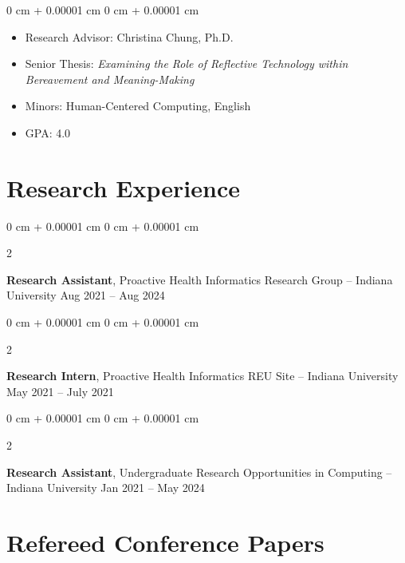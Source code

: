 \documentclass[10pt, letterpaper]{article}
\newenvironment{highlights}{
    \begin{itemize}[
        topsep=0.10 cm,
        parsep=0.10 cm,
        partopsep=0pt,
        itemsep=0pt,
        leftmargin=0 cm + 10pt
    ]
}{
    \end{itemize}
} %
\newenvironment{onecolentry}{
    \begin{adjustwidth}{
        0 cm + 0.00001 cm
    }{
        0 cm + 0.00001 cm
    }
}{
    \end{adjustwidth}
} %
\newenvironment{twocolentry}[2][]{
    \onecolentry
    \def\secondColumn{#2}
    \setcolumnwidth{\fill, 4.5 cm}
    \begin{paracol}{2}
}{
    \switchcolumn \raggedleft \secondColumn
    \end{paracol}
    \endonecolentry
} %
\begin{document}
        \vspace{0.10 cm}
        \begin{onecolentry}
            \begin{highlights}
                \item Research Advisor: Christina Chung, Ph.D.
                \item Senior Thesis: \textit{Examining the Role of Reflective Technology within Bereavement and Meaning-Making}
                \item Minors: Human-Centered Computing, English
                \item GPA: 4.0
            \end{highlights}
        \end{onecolentry}



    
    \section{Research Experience}



        
        \begin{twocolentry}{
            Aug 2021 – Aug 2024
        }
            \textbf{Research Assistant}, Proactive Health Informatics Research Group -- Indiana University\end{twocolentry}



        \vspace{0.2 cm}

        \begin{twocolentry}{
            May 2021 – July 2021
        }
            \textbf{Research Intern}, Proactive Health Informatics REU Site -- Indiana University\end{twocolentry}



        \vspace{0.2 cm}

        \begin{twocolentry}{
            Jan 2021 – May 2024
        }
            \textbf{Research Assistant}, Undergraduate Research Opportunities in Computing -- Indiana University\end{twocolentry}




    
    \section{Refereed Conference Papers}
\end{document}
